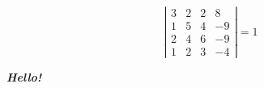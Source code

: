 \documentclass[12pt, a4paper]{article}
\begin{document}
    \begin{equation}
        \left|\begin{matrix}
            3 & 2 & 2 & 8 \\
            1 & 5 & 4 & -9 \\
            2 & 4 & 6 & -9 \\
            1 & 2 & 3 & -4
        \end{matrix}\right| = 1
    \end{equation}

    \textbf{\textit{Hello!}}
\end{document}
